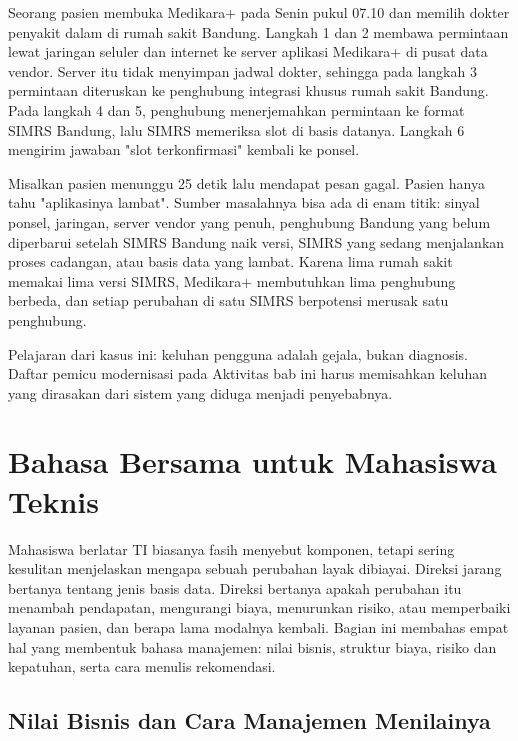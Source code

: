 \begin{kasus}[title={Kasus Medikara Health: Janji Temu dari Medikara+}]
  Seorang pasien membuka Medikara+ pada Senin pukul 07.10 dan memilih dokter penyakit
  dalam di rumah sakit Bandung. Langkah 1 dan 2 membawa permintaan lewat jaringan seluler
  dan internet ke server aplikasi Medikara+ di pusat data vendor. Server itu tidak
  menyimpan jadwal dokter, sehingga pada langkah 3 permintaan diteruskan ke penghubung
  integrasi khusus rumah sakit Bandung. Pada langkah 4 dan 5, penghubung menerjemahkan
  permintaan ke format SIMRS Bandung, lalu SIMRS memeriksa slot di basis datanya.
  Langkah 6 mengirim jawaban "slot terkonfirmasi" kembali ke ponsel.

  Misalkan pasien menunggu 25 detik lalu mendapat pesan gagal. Pasien hanya tahu
  "aplikasinya lambat". Sumber masalahnya bisa ada di enam titik: sinyal ponsel,
  jaringan, server vendor yang penuh, penghubung Bandung yang belum diperbarui setelah
  SIMRS Bandung naik versi, SIMRS yang sedang menjalankan proses cadangan, atau basis
  data yang lambat. Karena lima rumah sakit memakai lima versi SIMRS, Medikara+
  membutuhkan lima penghubung berbeda, dan setiap perubahan di satu SIMRS berpotensi
  merusak satu penghubung.

  Pelajaran dari kasus ini: keluhan pengguna adalah gejala, bukan diagnosis. Daftar
  pemicu modernisasi pada Aktivitas bab ini harus memisahkan keluhan yang dirasakan dari
  sistem yang diduga menjadi penyebabnya.
\end{kasus}

\section{Bahasa Bersama untuk Mahasiswa Teknis}

Mahasiswa berlatar TI biasanya fasih menyebut komponen, tetapi sering kesulitan
menjelaskan mengapa sebuah perubahan layak dibiayai. Direksi jarang bertanya tentang
jenis basis data. Direksi bertanya apakah perubahan itu menambah pendapatan, mengurangi
biaya, menurunkan risiko, atau memperbaiki layanan pasien, dan berapa lama modalnya
kembali. Bagian ini membahas empat hal yang membentuk bahasa manajemen: nilai bisnis,
struktur biaya, risiko dan kepatuhan, serta cara menulis rekomendasi.

\subsection{Nilai Bisnis dan Cara Manajemen Menilainya}

